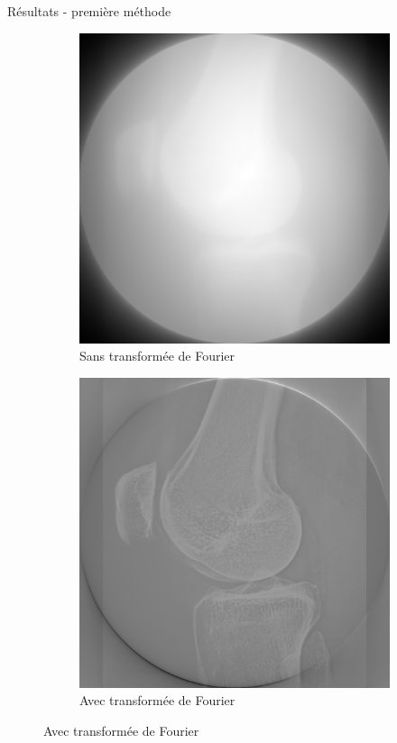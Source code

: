 \documentclass{beamer}
\begin{document}
\begin{frame}{Résultats - première méthode}
    \begin{figure}[t]
        \centering
        \begin{subfigure}[b]{0.42\textwidth}
            \includegraphics[width=\textwidth]{genouSansFFT.png}
            \caption{Sans transformée de Fourier}
        \end{subfigure}
        \qquad \qquad 
        \pause
        \begin{subfigure}[b]{0.42\textwidth}
            \includegraphics[width=\textwidth]{genouAvecFFT.png}
            \caption{Avec transformée de Fourier}
        \end{subfigure}
    \end{figure}
\end{frame}
\end{document}
